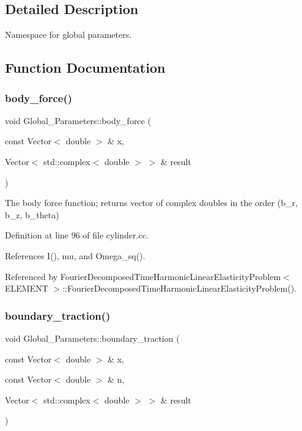 \subsection{Detailed Description}
Namespace for global parameters. 

\subsection{Function Documentation}
\mbox{\label{namespaceGlobal__Parameters_a8d30973505eeb753023936398bce5bcc}} 
\subsubsection{\texorpdfstring{body\+\_\+force()}{body\_force()}}
{\footnotesize\ttfamily void Global\+\_\+\+Parameters\+::body\+\_\+force (\begin{DoxyParamCaption}\item[{const Vector$<$ double $>$ \&}]{x,  }\item[{Vector$<$ std\+::complex$<$ double $>$ $>$ \&}]{result }\end{DoxyParamCaption})}



The body force function; returns vector of complex doubles in the order (b\+\_\+r, b\+\_\+z, b\+\_\+theta) 



Definition at line 96 of file cylinder.\+cc.



References I(), mu, and Omega\+\_\+sq().



Referenced by Fourier\+Decomposed\+Time\+Harmonic\+Linear\+Elasticity\+Problem$<$ E\+L\+E\+M\+E\+N\+T $>$\+::\+Fourier\+Decomposed\+Time\+Harmonic\+Linear\+Elasticity\+Problem().

\mbox{\label{namespaceGlobal__Parameters_a579fa434bf9ee57e66d4bd42b208fc23}} 
\subsubsection{\texorpdfstring{boundary\+\_\+traction()}{boundary\_traction()}}
{\footnotesize\ttfamily void Global\+\_\+\+Parameters\+::boundary\+\_\+traction (\begin{DoxyParamCaption}\item[{const Vector$<$ double $>$ \&}]{x,  }\item[{const Vector$<$ double $>$ \&}]{n,  }\item[{Vector$<$ std\+::complex$<$ double $>$ $>$ \&}]{result }\end{DoxyParamCaption})}



